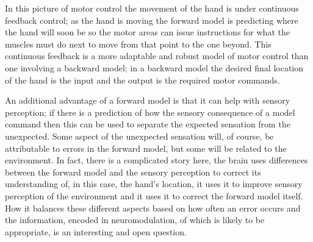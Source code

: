\documentclass[12pt]{article}
\begin{document}
In this picture of motor control the movement of the hand is under
continuous feedback control; as the hand is moving the forward model
is predicting where the hand will soon be so the motor areas can issue
instructions for what the muscles must do next to move from that point
to the one beyond. This continuous feedback is a more adaptable and
robust model of motor control than one involving a backward model; in
a backward model the desired final location of the hand is the input
and the output is the required motor commands. 

An additional advantage of a forward model is that it can help with
sensory perception; if there is a prediction of how the sensory
consequence of a model command then this can be used to separate the
expected sensation from the unexpected. Some aspect of the unexpected
sensation will, of course, be attributable to errors in the forward
model, but some will be related to the environment. In fact, there is
a complicated story here, the brain uses differences between the
forward model and the sensory perception to correct its understanding
of, in this case, the hand's location, it uses it to improve sensory
perception of the environment and it uses it to correct the forward
model itself. How it balances these different aspects based on how
often an error occurs and the information, encoded in neuromodulation,
of which is likely to be appropriate, is an interesting and open
question.




 {}
\end{document}
